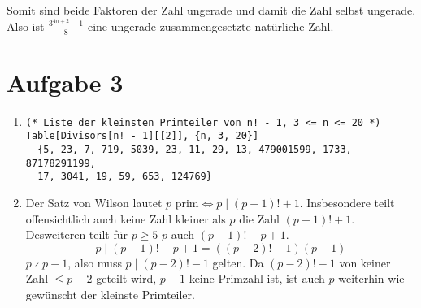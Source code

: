 Somit sind beide Faktoren der Zahl ungerade und damit die Zahl selbst ungerade.
Also ist $ \frac{3^{4n +2}-1}{8}$ eine ungerade zusammengesetzte natürliche Zahl.


\section*{Aufgabe 3}
\begin{enumerate}[(1)]
\item 
\lstset{language=Mathematica}
\begin{lstlisting}
(* Liste der kleinsten Primteiler von n! - 1, 3 <= n <= 20 *)
Table[Divisors[n! - 1][[2]], {n, 3, 20}]
  {5, 23, 7, 719, 5039, 23, 11, 29, 13, 479001599, 1733, 87178291199,
  17, 3041, 19, 59, 653, 124769}
\end{lstlisting}
\item Der Satz von Wilson lautet $ p \text{ prim} \Leftrightarrow p \mid (p-1)! + 1 $.
Insbesondere teilt offensichtlich auch keine Zahl kleiner als $p$ die Zahl $  (p-1)! + 1 $. Desweiteren
teilt für $p \geq 5$ $p$ auch $ (p-1)! -  p + 1$.
\[ p \mid (p-1)! - p + 1 = ((p-2)! - 1)(p-1) \]
$p \nmid p-1$, also muss $p \mid (p-2)! - 1 $ gelten. Da $(p-2)!-1$ von keiner Zahl $\leq p-2$ geteilt wird,
$p-1$ keine Primzahl ist, ist auch $p$ weiterhin wie gewünscht der kleinste Primteiler.
\end{enumerate}

